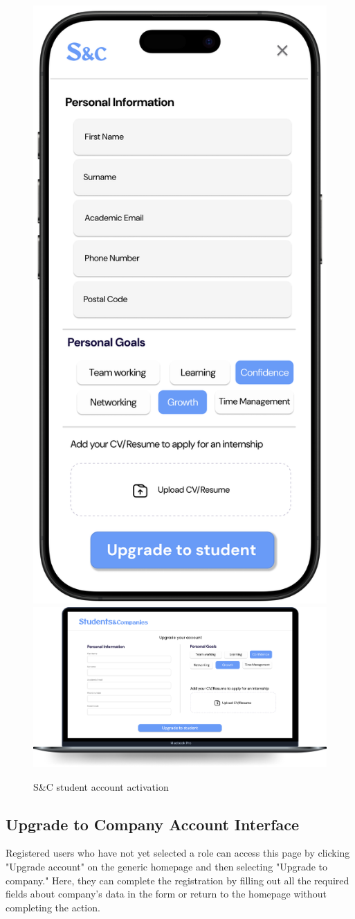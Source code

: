 \begin{figure}[H]
    \centering
    \includegraphics[width=0.2\linewidth]{Images/Mock-up/mobile upgrade to student.png}
    \includegraphics[width=0.75\linewidth]{Images/Mock-up/Upgrade to student.png}
    \caption{S\&C student account activation}
    \label{fig:homepage-design}
\end{figure}

\subsection{Upgrade to Company Account Interface}

Registered users who have not yet selected a role can access this page by clicking "Upgrade account" on the generic homepage and then selecting "Upgrade to company." Here, they can complete the registration by filling out all the required fields about company's data in the form or return to the homepage without completing the action. \\

